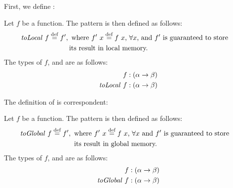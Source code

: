 First, we define \toLocal:
\begin{definition}
  \label{definition:pattern:toLocal}
  Let $f$ be a function.
  The \toLocal pattern is then defined as follows:
  \begin{align*}
    \text{\textit{toLocal}}\ f &\stackrel{\textrm{\scriptsize def}}{=} f',
    \begin{aligned}[t]
      &\text{ where $f'\ x \stackrel{\textrm{\scriptsize def}}{=} f\ x$, $\forall x$, and  $f'$ is guaranteed to store}\\
      &\text{its result in local memory.}
    \end{aligned}
  \end{align*}
  The types of $f$, and \toLocal are as follows:
  \begin{align*}
    f &: (\alpha \rightarrow \beta)\\
    \text{\textit{toLocal}}\ f &: (\alpha \rightarrow \beta)
  \end{align*}
\end{definition}

\noindent
The definition of \toGlobal is correspondent:
\begin{definition}
  \label{definition:pattern:toGlobal}
  Let $f$ be a function.
  The \toGlobal pattern is then defined as follows:
  \begin{align*}
    \text{\textit{toGlobal}}\ f &\stackrel{\textrm{\scriptsize def}}{=} f',
    \begin{aligned}[t]
      &\text{ where $f'\ x \stackrel{\textrm{\scriptsize def}}{=} f\ x$, $\forall x$ and $f'$ is guaranteed to store}\\
      &\text{ its result in global memory.}
    \end{aligned}
  \end{align*}
  The types of $f$, and \toLocal are as follows:
  \begin{align*}
    f &: (\alpha \rightarrow \beta)\\
    \text{\textit{toGlobal}}\ f &: (\alpha \rightarrow \beta)
  \end{align*}
\end{definition}



